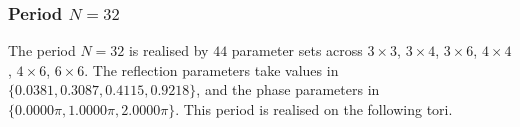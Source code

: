 \par
\subsubsection{Period $N = 32$}
The period $N=32$ is realised by $44$ parameter sets across $3\times3$, $3\times4$, $3\times6$, $4\times4$, $4\times6$, $6\times6$. The reflection parameters take values in $\{0.0381, 0.3087, 0.4115, 0.9218\}$, and the phase parameters in $\{0.0000\pi, 1.0000\pi, 2.0000\pi\}$. This period is realised on the following tori.
